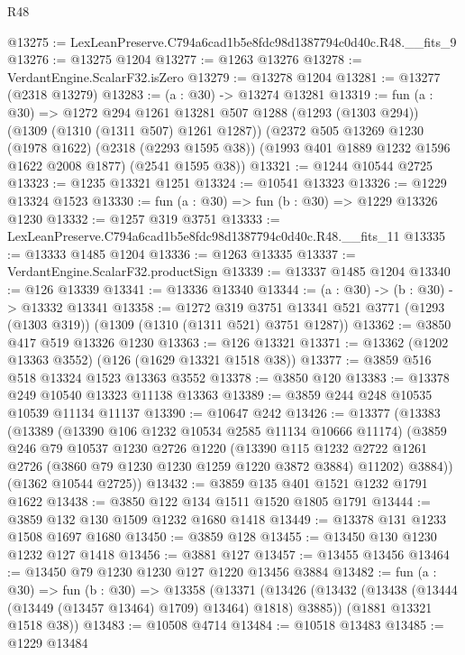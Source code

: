\begin{lexlean}{R48}
\begin{coremodule}
@13275 := LexLeanPreserve.C794a6cad1b5e8fdc98d1387794c0d40c.R48.__fits_9
@13276 := @13275 @1204
@13277 := @1263 @13276
@13278 := VerdantEngine.ScalarF32.isZero
@13279 := @13278 @1204
@13281 := @13277 (@2318 @13279)
@13283 := (a : @30) -> @13274 @13281
@13319 := fun (a : @30) =>
  @1272
    @294
    @1261
    @13281
    @507
    @1288
    (@1293 (@1303 @294))
    (@1309 (@1310 (@1311 @507) @1261 @1287))
    (@2372
      @505
      @13269
      @1230
      (@1978 @1622)
      (@2318 (@2293 @1595 @38))
      (@1993 @401 @1889 @1232 @1596 @1622 @2008 @1877)
      (@2541 @1595 @38))
@13321 := @1244 @10544 @2725
@13323 := @1235 @13321 @1251
@13324 := @10541 @13323
@13326 := @1229 @13324 @1523
@13330 := fun (a : @30) => fun (b : @30) => @1229 @13326 @1230
@13332 := @1257 @319 @3751
@13333 := LexLeanPreserve.C794a6cad1b5e8fdc98d1387794c0d40c.R48.__fits_11
@13335 := @13333 @1485 @1204
@13336 := @1263 @13335
@13337 := VerdantEngine.ScalarF32.productSign
@13339 := @13337 @1485 @1204
@13340 := @126 @13339
@13341 := @13336 @13340
@13344 := (a : @30) -> (b : @30) -> @13332 @13341
@13358 := @1272
    @319
    @3751
    @13341
    @521
    @3771
    (@1293 (@1303 @319))
    (@1309 (@1310 (@1311 @521) @3751 @1287))
@13362 := @3850 @417 @519 @13326 @1230
@13363 := @126 @13321
@13371 := @13362 (@1202 @13363 @3552) (@126 (@1629 @13321 @1518 @38))
@13377 := @3859 @516 @518 @13324 @1523 @13363 @3552
@13378 := @3850 @120
@13383 := @13378 @249 @10540 @13323 @11138 @13363
@13389 := @3859 @244 @248 @10535 @10539 @11134 @11137
@13390 := @10647 @242
@13426 := @13377
    (@13383
      (@13389
        (@13390 @106 @1232 @10534 @2585 @11134 @10666 @11174)
        (@3859
          @246
          @79
          @10537
          @1230
          @2726
          @1220
          (@13390
            @115
            @1232
            @2722
            @1261
            @2726
            (@3860 @79 @1230 @1230 @1259 @1220 @3872 @3884)
            @11202)
          @3884))
      (@1362 @10544 @2725))
@13432 := @3859 @135 @401 @1521 @1232 @1791 @1622
@13438 := @3850 @122 @134 @1511 @1520 @1805 @1791
@13444 := @3859 @132 @130 @1509 @1232 @1680 @1418
@13449 := @13378 @131 @1233 @1508 @1697 @1680
@13450 := @3859 @128
@13455 := @13450 @130 @1230 @1232 @127 @1418
@13456 := @3881 @127
@13457 := @13455 @13456
@13464 := @13450 @79 @1230 @1230 @127 @1220 @13456 @3884
@13482 := fun (a : @30) =>
  fun (b : @30) =>
  @13358
    (@13371
      (@13426 (@13432 (@13438 (@13444 (@13449 (@13457 @13464) @1709) @13464) @1818) @3885))
      (@1881 @13321 @1518 @38))
@13483 := @10508 @4714
@13484 := @10518 @13483
@13485 := @1229 @13484

\end{coremodule}
\end{lexlean}
